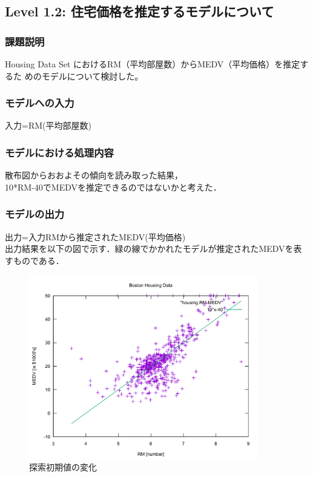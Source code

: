 \subsection{Level 1.2: 住宅価格を推定するモデルについて}

\subsubsection{課題説明}

Housing Data Set\cite{housingdata}
におけるRM（平均部屋数）からMEDV（平均価格）を推定するた
めのモデルについて検討した。

\subsubsection{モデルへの入力}

入力=RM(平均部屋数)

\subsubsection{モデルにおける処理内容}

散布図からおおよその傾向を読み取った結果，\\
10*RM-40でMEDVを推定できるのではないかと考えた．

\subsubsection{モデルの出力}

出力=入力RMから推定されたMEDV(平均価格)\\
出力結果を以下の図で示す．緑の線でかかれたモデルが推定されたMEDVを表すものである．

\begin{figure}[ht]
 \begin{center}
  \includegraphics[width=10.0cm]{figs/level1.2/housing.pdf}
  \caption{探索初期値の変化}
 \end{center}
\end{figure}



